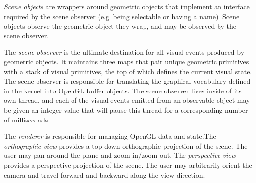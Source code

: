 \emph{Scene objects} are wrappers around geometric objects that implement an
interface required by the scene observer (e.g. being selectable or having a
name). Scene objects observe the geometric object they wrap, and may be observed
by the scene observer.

The \emph{scene observer} is the ultimate destination for all visual events
produced by geometric objects. It maintains three maps that pair unique
geometric primitives with a stack of visual primitives, the top of which defines
the current visual state. The scene observer is responsible for translating the
graphical vocabulary defined in the kernel into OpenGL buffer objects. The scene
observer lives inside of its own thread, and each of the visual events emitted
from an observable object may be given an integer value that will pause this
thread for a corresponding number of milliseconds.

The \emph{renderer} is responsible for managing OpenGL data and state.The
\emph{orthographic view} provides a top-down orthographic projection of the
scene. The user may pan around the plane and zoom in/zoom out. The
\emph{perspective view} provides a perspective projection of the scene. The user
may arbitrarily orient the camera and travel forward and backward along the view
direction.
